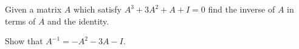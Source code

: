 
\begin{Exercise}[
name={},
title={}, 
difficulty=0,
origin={\cite{YL}}]
Given a matrix $A$ which satisfy $A^3+3A^2+A+I=0$ find the inverse of $A$ in terms of $A$ and the identity.
\end{Exercise}

\begin{Answer}
Show that $A^{-1}=-A^2-3A -I$.
\end{Answer}

